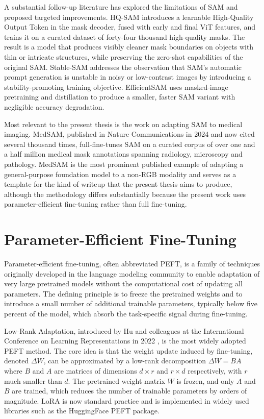 \documentclass[11pt,a4paper,oneside]{report}
\begin{document}
A substantial follow-up literature has explored the limitations of SAM and proposed targeted improvements. HQ-SAM \cite{Ke2023HQSAM} introduces a learnable High-Quality Output Token in the mask decoder, fused with early and final ViT features, and trains it on a curated dataset of forty-four thousand high-quality masks. The result is a model that produces visibly cleaner mask boundaries on objects with thin or intricate structures, while preserving the zero-shot capabilities of the original SAM. Stable-SAM addresses the observation that SAM's automatic prompt generation is unstable in noisy or low-contrast images by introducing a stability-promoting training objective. EfficientSAM uses masked-image pretraining and distillation to produce a smaller, faster SAM variant with negligible accuracy degradation.

Most relevant to the present thesis is the work on adapting SAM to medical imaging. MedSAM, published in Nature Communications in 2024 \cite{Ma2024MedSAM} and now cited several thousand times, full-fine-tunes SAM on a curated corpus of over one and a half million medical mask annotations spanning radiology, microscopy and pathology. MedSAM is the most prominent published example of adapting a general-purpose foundation model to a non-RGB modality and serves as a template for the kind of writeup that the present thesis aims to produce, although the methodology differs substantially because the present work uses parameter-efficient fine-tuning rather than full fine-tuning.

\section{Parameter-Efficient Fine-Tuning}

Parameter-efficient fine-tuning, often abbreviated PEFT, is a family of techniques originally developed in the language modeling community to enable adaptation of very large pretrained models without the computational cost of updating all parameters. The defining principle is to freeze the pretrained weights and to introduce a small number of additional trainable parameters, typically below five percent of the model, which absorb the task-specific signal during fine-tuning.

Low-Rank Adaptation, introduced by Hu and colleagues at the International Conference on Learning Representations in 2022 \cite{Hu2022LoRA}, is the most widely adopted PEFT method. The core idea is that the weight update induced by fine-tuning, denoted $\Delta W$, can be approximated by a low-rank decomposition $\Delta W = BA$ where $B$ and $A$ are matrices of dimensions $d \times r$ and $r \times d$ respectively, with $r$ much smaller than $d$. The pretrained weight matrix $W$ is frozen, and only $A$ and $B$ are trained, which reduces the number of trainable parameters by orders of magnitude. LoRA is now standard practice and is implemented in widely used libraries such as the HuggingFace PEFT package.
\end{document}
